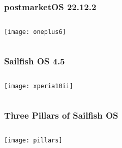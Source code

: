 \documentclass[
	notes=none,
	aspectratio=169
]{beamer}
\begin{document}

\begin{frame}
\frametitle{postmarketOS 22.12.2}

\begin{columns}[T]
\begin{column}[T]{1.0\textwidth}

\vspace{0.43cm}
\begin{center}
\texttt{[image: oneplus6]}
\end{center}

\end{column}
\end{columns}

\end{frame}
\note{
}


\begin{frame}
\frametitle{Sailfish OS 4.5}

\begin{columns}[T]
\begin{column}[T]{1.0\textwidth}

\vspace{0.3cm}
\begin{center}
\texttt{[image: xperia10ii]}
\end{center}

\end{column}
\end{columns}

\end{frame}
\note{
}


\begin{frame}
\frametitle{Three Pillars of Sailfish OS}

\begin{columns}[T]
\begin{column}[T]{1.0\textwidth}

\vspace{0.5cm}
\begin{center}
\texttt{[image: pillars]}
\end{center}

\end{column}
\end{columns}

\end{frame}
\note{
}
\end{document}

